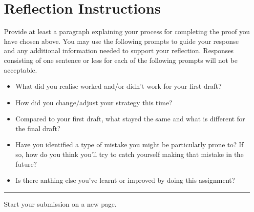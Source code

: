 \documentclass{article}
\theoremstyle{definition}
\newtheorem*{claim}{Claim} %
\newtheorem*{reflection}{Reflection} %
\begin{document}
\vfill


\section*{Reflection Instructions}

Provide at least a paragraph explaining your process for completing the proof you have chosen above. You may use the following prompts to guide your response and any additional information needed to support your reflection. Responses consisting of one sentence or less for each of the following prompts will not be acceptable.

\begin{itemize}
    \item What did you realise worked and/or didn't work for your first draft?
    \item How did you change/adjust your strategy this time?
    \item Compared to your first draft, what stayed the same and what is different for the final draft?
    \item Have you identified a type of mistake you might be particularly prone to? If so, how do you think you'll try to catch yourself making that mistake in the future?
    \item Is there anthing else you've learnt or improved by doing this assignment?
\end{itemize}


\vfill
\hrule\medskip
\noindent Start your submission on a new page.




\end{document}
